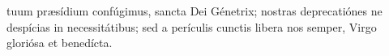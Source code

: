  tuum pr{\ae}sídium confúgimus, sancta Dei Génetrix; nostras deprecatiónes ne despícias
in necessitátibus; sed a perículis cunctis libera nos semper, Virgo gloriósa et benedícta.